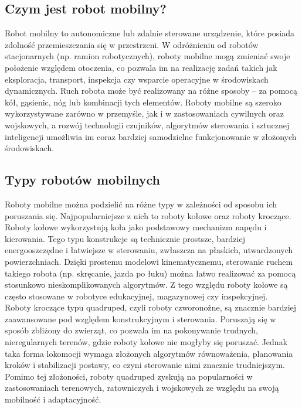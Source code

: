 \documentclass[12pt]{article}
\begin{document}
\subsection{Czym jest robot mobilny?}

Robot mobilny to autonomiczne lub zdalnie sterowane urządzenie, które posiada zdolność przemieszczania się w przestrzeni. W odróżnieniu od robotów stacjonarnych (np. ramion robotycznych), roboty mobilne mogą zmieniać swoje położenie względem otoczenia, co pozwala im na realizację zadań takich jak eksploracja, transport, inspekcja czy wsparcie operacyjne w środowiskach dynamicznych. Ruch robota może być realizowany na różne sposoby – za pomocą kół, gąsienic, nóg lub kombinacji tych elementów. Roboty mobilne są szeroko wykorzystywane zarówno w przemyśle, jak i w zastosowaniach cywilnych oraz wojskowych, a rozwój technologii czujników, algorytmów sterowania i sztucznej inteligencji umożliwia im coraz bardziej samodzielne funkcjonowanie w złożonych środowiskach.


\subsection{Typy robotów mobilnych}

\noindent Roboty mobilne można podzielić na różne typy w zależności od sposobu ich poruszania się. Najpopularniejsze z nich to roboty kołowe oraz roboty kroczące.\\

\noindent Roboty kołowe wykorzystują koła jako podstawowy mechanizm napędu i kierowania. Tego typu konstrukcje są technicznie prostsze, bardziej energooszczędne i łatwiejsze w sterowaniu, zwłaszcza na płaskich, utwardzonych powierzchniach. Dzięki prostemu modelowi kinematycznemu, sterowanie ruchem takiego robota (np. skręcanie, jazda po łuku) można łatwo realizować za pomocą stosunkowo nieskomplikowanych algorytmów. Z tego względu roboty kołowe są często stosowane w robotyce edukacyjnej, magazynowej czy inspekcyjnej.\\

\noindent Roboty kroczące typu quadruped, czyli roboty czworonożne, są znacznie bardziej zaawansowane pod względem konstrukcyjnym i sterowania. Poruszają się w sposób zbliżony do zwierząt, co pozwala im na pokonywanie trudnych, nieregularnych terenów, gdzie roboty kołowe nie mogłyby się poruszać. Jednak taka forma lokomocji wymaga złożonych algorytmów równoważenia, planowania kroków i stabilizacji postawy, co czyni sterowanie nimi znacznie trudniejszym. Pomimo tej złożoności, roboty quadruped zyskują na popularności w~ zastosowaniach terenowych, ratowniczych i wojskowych ze względu na swoją mobilność i adaptacyjność.
\end{document}
